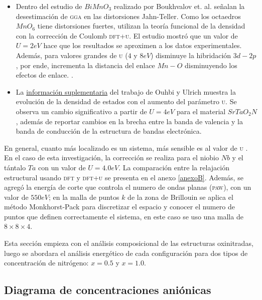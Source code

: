\begin{itemize}
    \item Dentro del estudio de $BiMnO_{3}$ realizado por Boukhvalov et. al. \cite{Boukhvalov2010} señalan la desestimación de \textsc{gga} en las distorsiones Jahn-Teller. Como los octaedros $MnO_{6}$ tiene distorsiones fuertes, utilizan la teoría funcional de la densidad con la corrección de Coulomb \textsc{dft+u}. El estudio mostró que un valor de $U=2 eV$ hace que los resultados se aproximen a los datos experimentales. Además, para valores grandes de \textsc{u} ($4$ y $8 eV$) disminuye la hibridación $3d-2p$, por ende, incrementa la distancia del enlace $Mn-O$ disminuyendo los efectos de enlace. \cite{Boukhvalov2010}.
    
    \item La \href{https://pubs.acs.org/doi/suppl/10.1021/acsmaterialslett.9b00088/suppl_file/tz9b00088_si_001.pdf}{información suplementaria} del trabajo de Ouhbi y Ulrich \cite{Ulrich2019} muestra la evolución de la densidad de estados con el aumento del parámetro \textsc{u}. Se observa un cambio significativo a partir de $U=4  eV$ para el material $SrTaO_{2}N$, además de reportar cambios en la brecha entre la banda de valencia y la banda de conducción de la estructura de bandas electrónica.
\end{itemize}

En general, cuanto más localizado es un sistema, más sensible es al valor de \textsc{u} \cite{Tolba2018}. En el caso de esta investigación, la corrección se realiza para el niobio $Nb$ y el tántalo $Ta$ con un valor de $U=4.0 eV$. La comparación entre la relajación estructural usando \textsc{dft} y \textsc{dft+u} se presenta en el anexo \ref{anexoB}. Además, se agregó la energía de corte que controla el numero de ondas planas (\textsc{paw}), con un valor de $550 eV$; en la malla de puntos $k$ de la zona de Brillouin se aplica el método Monkhorst-Pack \cite{Monkh1976} para discretizar el espacio y conocer el numero de puntos que definen correctamente el sistema, en este caso se uso una malla de $8\times8\times4$. 
 
Esta sección empieza con el análisis composicional de las estructuras oxinitradas, luego se abordara el análisis energético de cada configuración para dos tipos de concentración de nitrógeno: $x=0.5$ y $x=1.0$.

\subsection{Diagrama de concentraciones aniónicas}

